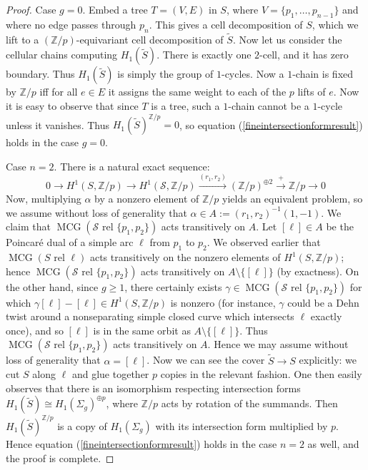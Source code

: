 \documentclass[12pt]{article}
\theoremstyle{plain}
\theoremstyle{definition}
\theoremstyle{remark}
\numberwithin{equation}{section}
\begin{document}
\begin{proof}
Case $g=0$.  Embed a tree $T=(V,E)$ in $S$, where $V=\{p_1,\ldots,p_{n-1}\}$ and where no edge passes through $p_n$.  This gives a cell decomposition of $S$, which we lift to a $(\mathbb Z/p)$-equivariant cell decomposition of $\tilde S$.  Now let us consider the cellular chains computing $H_1(\tilde S)$.  There is exactly one $2$-cell, and it has zero boundary.  Thus $H_1(\tilde S)$ is simply the group of $1$-cycles.  Now a $1$-chain is fixed by $\mathbb Z/p$ iff for all $e\in E$ it assigns the same weight to each of the $p$ lifts of $e$.  Now it is easy to observe that since $T$ is a tree, such a $1$-chain cannot be a $1$-cycle unless it vanishes.  Thus $H_1(\tilde S)^{\mathbb Z/p}=0$, so equation (\ref{fineintersectionformresult}) holds in the case $g=0$.

Case $n=2$.  There is a natural exact sequence:
\begin{equation}
0\to H^1(S,\mathbb Z/p)\to H^1(\mathcal S,\mathbb Z/p)\xrightarrow{(r_1,r_2)}(\mathbb Z/p)^{\oplus 2}\xrightarrow{+}\mathbb Z/p\to 0
\end{equation}
Now, multiplying $\alpha$ by a nonzero element of $\mathbb Z/p$ yields an equivalent problem, so we assume without loss of generality that $\alpha\in A:=(r_1,r_2)^{-1}(1,-1)$.  We claim that $\operatorname{MCG}(\mathcal S\text{ rel }\{p_1,p_2\})$ acts transitively on $A$.  Let $[\ell]\in A$ be the Poincar\'e dual of a simple arc $\ell$ from $p_1$ to $p_2$.  We observed earlier that $\operatorname{MCG}(S\text{ rel }\ell)$ acts transitively on the nonzero elements of $H^1(S,\mathbb Z/p)$; hence $\operatorname{MCG}(\mathcal S\text{ rel }\{p_1,p_2\})$ acts transitively on $A\setminus\{[\ell]\}$ (by exactness).  On the other hand, since $g\geq 1$, there certainly exists $\gamma\in\operatorname{MCG}(\mathcal S\text{ rel }\{p_1,p_2\})$ for which $\gamma[\ell]-[\ell]\in H^1(S,\mathbb Z/p)$ is nonzero (for instance, $\gamma$ could be a Dehn twist around a nonseparating simple closed curve which intersects $\ell$ exactly once), and so $[\ell]$ is in the same orbit as $A\setminus\{[\ell]\}$.  Thus $\operatorname{MCG}(\mathcal S\text{ rel }\{p_1,p_2\})$ acts transitively on $A$.  Hence we may assume without loss of generality that $\alpha=[\ell]$.  Now we can see the cover $\tilde S\to S$ explicitly: we cut $S$ along $\ell$ and glue together $p$ copies in the relevant fashion.  One then easily observes that there is an isomorphism respecting intersection forms $H_1(\tilde S)\cong H_1(\Sigma_g)^{\oplus p}$, where $\mathbb Z/p$ acts by rotation of the summands.  Then $H_1(\tilde S)^{\mathbb Z/p}$ is a copy of $H_1(\Sigma_g)$ with its intersection form multiplied by $p$.  Hence equation (\ref{fineintersectionformresult}) holds in the case $n=2$ as well, and the proof is complete.
\end{proof}



\end{document}
